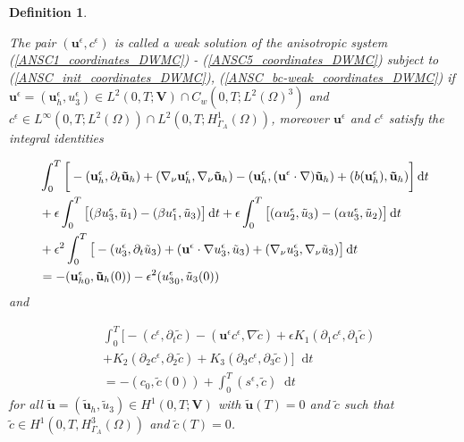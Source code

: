 \documentclass[12pt]{report}
\numberwithin{theorem}{chapter}
\numberwithin{corollary}{chapter}
\numberwithin{lemma}{chapter}
\numberwithin{remark}{chapter}
\newtheorem{definition}{Definition}
\numberwithin{definition}{chapter}
\numberwithin{prop}{chapter}
\newcommand*\diff{\mathop{}\!\mathrm{d}}
\begin{document}
\begin{definition} \label{definitionanisotropicWF_dwmc}

The pair $(\mathbf{u}^\epsilon, c^\epsilon)$ is called a weak solution of the anisotropic system (\ref{ANSC1_coordinates_DWMC}) - (\ref{ANSC5_coordinates_DWMC}) subject to (\ref{ANSC_init_coordinates_DWMC}), (\ref{ANSC_bc-weak_coordinates_DWMC}) if $\mathbf{u}^\epsilon = (\mathbf{u}^\epsilon_h, u^\epsilon_3) \in L^2 (0,T ; \mathbf{V}) \cap C_w (0, T; L^2 (\Omega)^3)$ and $c^\epsilon \in L^\infty (0,T; L^2(\Omega)) \cap L^2 (0,T; H^1_{\Gamma_A}(\Omega))$, moreover $\mathbf{u}^\epsilon$ and $c^\epsilon$ satisfy the integral identities
  
\begin{equation}
\begin{split}
& \int_0^T \bigg [ -(\mathbf{u}^\epsilon_h, \partial_t \mathbf{\tilde{u}}_h) + (\nabla_\nu \mathbf{u}^\epsilon_h, \nabla_\nu \mathbf{\tilde{u}}_h) - (\mathbf{u}^\epsilon_h, (\mathbf{u}^\epsilon \cdot \nabla) \mathbf{\tilde{u}}_h) + (b(\mathbf{u}^\epsilon_h), \mathbf{\tilde{u}}_h) \bigg ] \diff t \\
& + \epsilon \int_0 ^ T \big [ (\beta u_3 ^\epsilon, \tilde{u}_1) - (\beta u_1^\epsilon, \tilde{u}_3) \big ] \diff t + \epsilon \int_0 ^ T \big [ (\alpha u_2 ^\epsilon, \tilde{u}_3) - (\alpha u_3^\epsilon, \tilde{u}_2) \big ] \diff t\\
& + \epsilon^2 \int _0 ^ T \big [ -(u_3^\epsilon, \partial_t \tilde{u}_3) +(\mathbf{u}^\epsilon \cdot \nabla u_3 ^ \epsilon, \tilde{u}_3) + (\nabla_\nu u_3^\epsilon, \nabla_\nu \tilde{u}_3) \big ] \diff t \\
& = - ({\mathbf{u}^\epsilon_h}_0, \mathbf{\tilde{u}}_h(0)) - \epsilon^2 ({u^\epsilon_3}_0, \tilde{u}_3 (0)) \raisetag{20pt} \label{anisotropicWF}
\end{split}
\end{equation}
%  
and
  
\begin{equation}
\begin{split} \nonumber
& \int_0^T \bigg [ -(c^\epsilon, \partial_t \tilde{c}) -(\mathbf{u}^\epsilon c^\epsilon, \nabla \tilde{c}) + \epsilon K_1 (\partial_1 c^\epsilon, \partial_1 \tilde{c}) \\
& + K_2 (\partial_2 c^\epsilon, \partial_2 \tilde{c}) + K_3 (\partial_3 c^\epsilon, \partial_3 \tilde{c}) \bigg ] \diff t \\
& =  - (c_0, \tilde{c} (0)) + \int_0^T (s^\epsilon,\tilde{c}) \diff t
\end{split}
\end{equation}
%
for all $\mathbf{\tilde{u}} = (\mathbf{\tilde{u}}_h, \tilde{u}_3) \in H^1 (0,T;\mathbf{V})$ with $\mathbf{\tilde{u}}(T) = 0$ and $\tilde{c}$ such that $\tilde{c} \in H^1 (0,T, H^3_{\Gamma_A} (\Omega))$ and $\tilde{c} (T) = 0$.
  
\end{definition}
\end{document}
